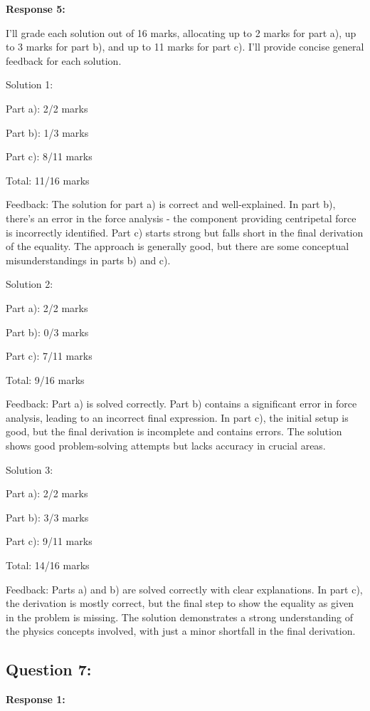 \documentclass[a4paper,11pt]{article}
\begin{document}
\bigskip
\textbf{Response 5:}

I'll grade each solution out of 16 marks, allocating up to 2 marks for part a), up to 3 marks for part b), and up to 11 marks for part c). I'll provide concise general feedback for each solution.

Solution 1:

Part a): 2/2 marks

Part b): 1/3 marks

Part c): 8/11 marks

Total: 11/16 marks

Feedback: The solution for part a) is correct and well-explained. In part b), there's an error in the force analysis - the component providing centripetal force is incorrectly identified. Part c) starts strong but falls short in the final derivation of the equality. The approach is generally good, but there are some conceptual misunderstandings in parts b) and c).

Solution 2:

Part a): 2/2 marks

Part b): 0/3 marks

Part c): 7/11 marks

Total: 9/16 marks

Feedback: Part a) is solved correctly. Part b) contains a significant error in force analysis, leading to an incorrect final expression. In part c), the initial setup is good, but the final derivation is incomplete and contains errors. The solution shows good problem-solving attempts but lacks accuracy in crucial areas.

Solution 3:

Part a): 2/2 marks

Part b): 3/3 marks

Part c): 9/11 marks

Total: 14/16 marks

Feedback: Parts a) and b) are solved correctly with clear explanations. In part c), the derivation is mostly correct, but the final step to show the equality as given in the problem is missing. The solution demonstrates a strong understanding of the physics concepts involved, with just a minor shortfall in the final derivation.


\subsection*{Question 7:}

\textbf{Response 1:}
\end{document}
